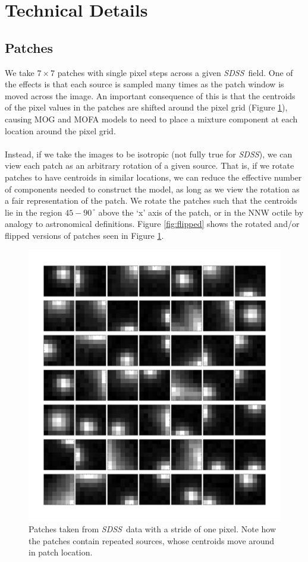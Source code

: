 \documentclass[letterpaper,12pt]{article}
\newcommand{\sdss}{{\it SDSS}}
\begin{document}
\section{Technical Details}

\subsection{Patches}


We take $7\times7$ patches with single pixel steps across a given \sdss\, field.  
One of the effects is that each source is sampled many times as the patch 
window is moved across the image.  An important consequence of this is that 
the centroids of the pixel values in the patches are shifted around the pixel grid
(Figure \ref{fig:unflipped}), causing MOG and MOFA models to need to place a 
mixture component at each location around the pixel grid.  
\\ \\
Instead, if we take the images to be isotropic (not fully true for \sdss), we can 
view each patch as an arbitrary rotation of a given source.  That is, if we rotate 
patches to have centroids in similar locations, we can reduce the effective 
number of components needed to construct the model, as long as we view the 
rotation as a fair representation of the patch.  We rotate the patches such that 
the centroids lie in the region $45-90^{\,\circ}$ above the `x' axis of the patch, 
or in the NNW octile by analogy to astronomical definitions.  Figure 
\ref{fig:flipped} shows the rotated and/or flipped versions of patches seen in 
Figure \ref{fig:unflipped}.

\begin{figure}
\includegraphics[clip=true, trim=0cm 0cm 0.0cm 0.cm,width=12cm]{figures/unflipped.pdf}
\caption{Patches taken from \sdss\, data with a stride of one pixel.  Note how 
the patches contain repeated sources, whose centroids move around in 
patch location.}
\label{fig:unflipped}
\end{figure}
\end{document}
